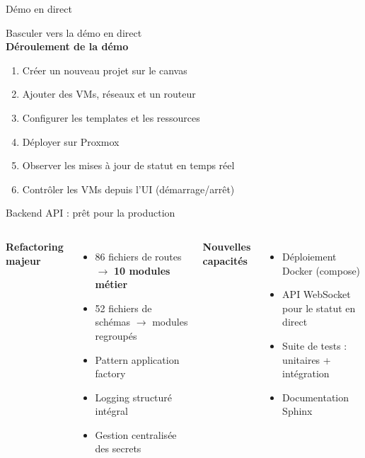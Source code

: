 \documentclass[aspectratio=169]{beamer}
\begin{document}
\begin{frame}{D\'emo en direct \; \faPlay}
  \begin{center}
    {\Large \faDesktop\quad Basculer vers la d\'emo en direct}\\[8mm]
    \textbf{D\'eroulement de la d\'emo}\\[4mm]
    \begin{enumerate}
      \item Cr\'eer un nouveau projet sur le canvas
      \item Ajouter des VMs, r\'eseaux et un routeur
      \item Configurer les templates et les ressources
      \item D\'eployer sur Proxmox
      \item Observer les mises \`a jour de statut en temps r\'eel
      \item Contr\^oler les VMs depuis l'UI (d\'emarrage/arr\^et)
    \end{enumerate}
  \end{center}
\end{frame}

\begin{frame}{Backend API : pr\^et pour la production \; \faCogs}
  \begin{columns}[T]
    \textbf{Refactoring majeur}
    \begin{itemize}
      \item 86 fichiers de routes $\rightarrow$ \textbf{10 modules m\'etier}
      \item 52 fichiers de sch\'emas $\rightarrow$ modules regroup\'es
      \item Pattern application factory
      \item Logging structur\'e int\'egral
      \item Gestion centralis\'ee des secrets
    \end{itemize}

    \textbf{Nouvelles capacit\'es}
    \begin{itemize}
      \item \alert{D\'eploiement Docker} (compose)
      \item \alert{API WebSocket} pour le statut en direct
      \item \alert{Suite de tests} : unitaires + int\'egration
      \item \alert{Documentation Sphinx}
    \end{itemize}
  \end{columns}
\end{frame}
\end{document}
